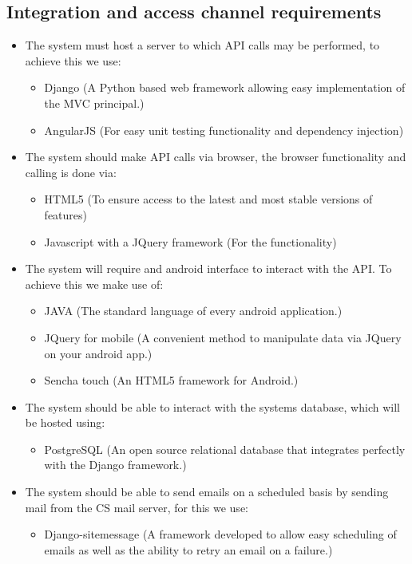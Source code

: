 \documentclass{article}
\begin{document}
		\cleardoublepage
		
	\subsection{Integration and access channel requirements}\label{subsec:integration}
		
			\begin{itemize}
				\item The system must host a server to which API calls may be performed, to achieve this we use:
					\begin{itemize}
						\item Django (A Python based web framework allowing easy implementation of the MVC principal.)
						\item AngularJS (For easy unit testing functionality and dependency injection)
					\end{itemize}
				\item The system should make API calls via browser, the browser functionality and calling is done via:
					\begin{itemize}
						\item HTML5 (To ensure access to the latest and most stable versions of features)
						\item Javascript with a JQuery framework (For the functionality)
					\end{itemize}
				\item The system will require and android interface to interact with the API. To achieve this we make use of:
					\begin{itemize}
						\item JAVA (The standard language of every android application.)
						\item JQuery for mobile (A convenient method to manipulate data via JQuery on your android app.)
						\item Sencha touch (An HTML5 framework for Android.)
					\end{itemize}
				\item The system should be able to interact with the systems database, which will be hosted using:
					\begin{itemize}
						\item PostgreSQL (An open source relational database that integrates perfectly with the Django framework.)
					\end{itemize}
				\item The system should be able to send emails on a scheduled basis by sending mail from the CS mail server, for this we use:
					\begin{itemize}
						\item Django-sitemessage (A framework developed to allow easy scheduling of emails as well as the ability to retry an email on a failure.)\newline
					\end{itemize}

			\end{itemize}
			
\end{document}
